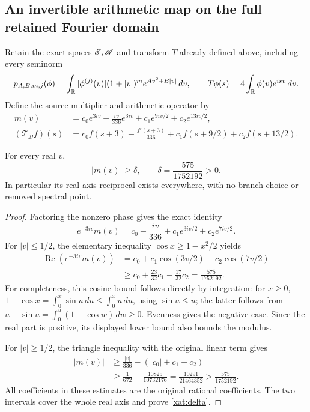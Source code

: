 \subsection{An invertible arithmetic map on the full retained Fourier domain}

Retain the exact spaces \(\mathscr E,\mathscr A\) and transform \(T\) already
defined above, including every seminorm
\[
p_{A,B,m,j}(\phi)=\int_\mathbb R|\phi^{(j)}(v)|(1+|v|)^m
                         e^{Av^2+B|v|}\,dv,
\qquad T\phi(s)=4\int_\mathbb R\phi(v)e^{isv}\,dv.
\]
Define the source multiplier and arithmetic operator by
\begin{align}
m(v)&=c_0e^{3iv}-\frac{iv}{336}e^{3iv}
               +c_1e^{9iv/2}+c_2e^{13iv/2},
\label{xat:multiplier}\\
(\mathcal T_{\mathcal D}f)(s)
 &=c_0f(s+3)-\frac{f'(s+3)}{336}
                  +c_1f(s+9/2)+c_2f(s+13/2).
\label{xat:T-D}
\end{align}

\begin{lemma}
\label{xat:nonzero-multiplier}
For every real \(v\),
\begin{equation}
|m(v)|\geq\delta,\qquad \delta=\frac{575}{1752192}>0.
\label{xat:delta}
\end{equation}
In particular its real-axis reciprocal exists everywhere, with no
branch choice or removed spectral point.
\end{lemma}

\begin{proof}
Factoring the nonzero phase gives the exact identity
\[
e^{-3iv}m(v)=c_0-\frac{iv}{336}
                  +c_1e^{3iv/2}+c_2e^{7iv/2}.
\]
For \(|v|\leq1/2\), the elementary inequality
\(\cos x\geq1-x^2/2\) yields
\begin{align*}
\operatorname{Re}(e^{-3iv}m(v))
 &=c_0+c_1\cos(3v/2)+c_2\cos(7v/2)\\
 &\geq c_0+\frac{23}{32}c_1-\frac{17}{32}c_2
 =\frac{575}{1752192}.
\end{align*}
For completeness, this cosine bound follows directly by integration:
for \(x\geq0\),
\(1-\cos x=\int_0^x\sin u\,du\leq\int_0^xu\,du\), using
\(\sin u\leq u\); the latter follows from
\(u-\sin u=\int_0^u(1-\cos w)\,dw\geq0\). Evenness gives the
negative case. Since the real part is positive, its displayed
lower bound also bounds the modulus.

For \(|v|\geq1/2\), the triangle inequality with the original
linear term gives
\begin{align*}
|m(v)|&\geq\frac{|v|}{336}-(|c_0|+c_1+c_2)\\
 &\geq\frac1{672}-\frac{10825}{10732176}
 =\frac{10291}{21464352}
 >\frac{575}{1752192}.
\end{align*}
All coefficients in these estimates are the original rational
coefficients. The two intervals cover the whole real axis and
prove \eqref{xat:delta}.
\end{proof}

